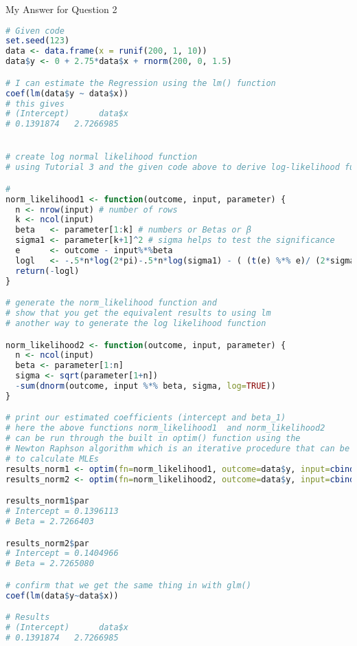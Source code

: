 \documentclass[12pt,letterpaper]{article}
\begin{document}
\noindent My Answer for Question 2

\begin{lstlisting}[language=R]
# Given code
set.seed(123)
data <- data.frame(x = runif(200, 1, 10))
data$y <- 0 + 2.75*data$x + rnorm(200, 0, 1.5)

# I can estimate the Regression using the lm() function
coef(lm(data$y ~ data$x))
# this gives
# (Intercept)      data$x 
# 0.1391874   2.7266985 


# create log normal likelihood function 
# using Tutorial 3 and the given code above to derive log-likelihood function 

# 
norm_likelihood1 <- function(outcome, input, parameter) {
  n <- nrow(input) # number of rows
  k <- ncol(input)
  beta   <- parameter[1:k] # numbers or Betas or β
  sigma1 <- parameter[k+1]^2 # sigma helps to test the significance 
  e      <- outcome - input%*%beta
  logl   <- -.5*n*log(2*pi)-.5*n*log(sigma1) - ( (t(e) %*% e)/ (2*sigma1) )
  return(-logl)
}

# generate the norm_likelihood function and 
# show that you get the equivalent results to using lm
# another way to generate the log likelihood function

norm_likelihood2 <- function(outcome, input, parameter) {
  n <- ncol(input)
  beta <- parameter[1:n]
  sigma <- sqrt(parameter[1+n])
  -sum(dnorm(outcome, input %*% beta, sigma, log=TRUE))
}

# print our estimated coefficients (intercept and beta_1)
# here the above functions norm_likelihood1  and norm_likelihood2 
# can be run through the built in optim() function using the 
# Newton Raphson algorithm which is an iterative procedure that can be used 
# to calculate MLEs
results_norm1 <- optim(fn=norm_likelihood1, outcome=data$y, input=cbind(1, data$x), par=c(1,1,1), hessian=T, method="BFGS")
results_norm2 <- optim(fn=norm_likelihood2, outcome=data$y, input=cbind(1, data$x), par=c(1,1,1), hessian=T, method="BFGS")

results_norm1$par
# Intercept = 0.1396113
# Beta = 2.7266403

results_norm2$par
# Intercept = 0.1404966
# Beta = 2.7265080

# confirm that we get the same thing in with glm()
coef(lm(data$y~data$x))

# Results
# (Intercept)      data$x 
# 0.1391874   2.7266985 
\end{lstlisting}
\end{document}

